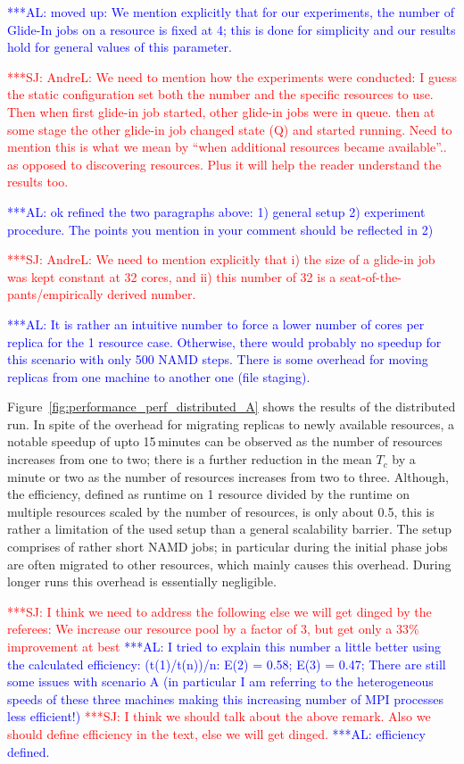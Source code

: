 \documentclass{rspublic}
\newcommand{\alnote}[1]{ {\textcolor{blue} { ***AL: #1 }}}
\newcommand{\jhanote}[1]{ {\textcolor{red} { ***SJ: #1 }}}
\newcommand{\alnote}[1]{}
\newcommand{\jhanote}[1]{}
\begin{document}
\alnote{moved up: We mention explicitly that for our experiments, the
  number of Glide-In jobs on a resource is fixed at 4; this is done
  for simplicity and our results hold for general values of this
  parameter.}

\jhanote{AndreL: We need to mention how the experiments were
  conducted: I guess the static configuration set both the number and
  the specific resources to use. Then when first glide-in job started,
  other glide-in jobs were in queue. then at some stage the other
  glide-in job changed state (Q) and started running. Need to mention
  this is what we mean by ``when additional resources became
  available''.. as opposed to discovering resources. Plus it will help
  the reader understand the results too.}

\alnote{ok refined the two paragraphs above: 1) general setup 2)
  experiment procedure. The points you mention in your comment should
  be reflected in 2)}

\jhanote{AndreL: We need to mention explicitly that i) the size of a
  glide-in job was kept constant at 32 cores, and ii) this number of
  32 is a seat-of-the-pants/empirically derived number.}

\alnote{It is rather an intuitive number to force a lower number of
  cores per replica for the 1 resource case. Otherwise, there would
  probably no speedup for this scenario with only 500 NAMD
  steps. There is some overhead for moving replicas from one machine
  to another one (file staging).}

Figure~\ref{fig:performance_perf_distributed_A} shows the results of
the distributed run. In spite of the overhead for migrating replicas
to newly available resources, a notable speedup of upto 15\,minutes
can be observed as the number of resources increases from one to two;
there is a further reduction in the mean $T_c$ by a minute or two as
the number of resources increases from two to three.  Although, the
efficiency, defined as runtime on 1 resource divided by the runtime
on multiple resources scaled by the number of resources, 
is only about 0.5, this is rather a
limitation of the used setup than a general scalability barrier.  The
setup comprises of rather short NAMD jobs; in particular during the
initial phase jobs are often migrated to other resources, which mainly
causes this overhead. During longer runs this overhead is essentially
negligible.

\jhanote{I think we need to address
  the following else we will get dinged by the referees: We increase
  our resource pool by a factor of 3, but get only a 33\% improvement
  at best} \alnote{I tried to explain this number a little better
  using the calculated efficiency: (t(1)/t(n))/n: E(2) = 0.58; E(3) =
  0.47; There are still some issues with scenario A (in particular I
  am referring to the heterogeneous speeds of these three machines
  making this increasing number of MPI processes less efficient!)}
\jhanote{I think we should talk about the above remark. Also we should
  define efficiency in the text, else we will get dinged.}  
\alnote{efficiency defined.}
\end{document}
